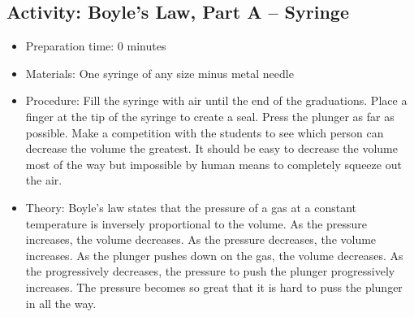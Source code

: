 \begin{itemize}
{\begin{itemize}
\subsection{Activity: Boyle’s Law, Part A – Syringe}
\begin{itemize}
\item{Preparation time: 0 minutes}
\item{Materials: One syringe of any size minus metal needle}
\item{Procedure: Fill the syringe with air until the end of the graduations. Place a finger at the tip of the syringe to create a seal. Press the plunger as far as possible. Make a competition with the students to see which person can decrease the volume the greatest. It should be easy to decrease the volume most of the way but impossible by human means to completely squeeze out the air.}
\item{Theory: Boyle’s law states that the pressure of a gas at a constant temperature is inversely proportional to the volume. As the pressure increases, the volume decreases. As the pressure decreases, the volume increases. As the plunger pushes down on the gas, the volume decreases. As the progressively decreases, the pressure to push the plunger progressively increases. The pressure becomes so great that it is hard to puss the plunger in all the way. }
\end{itemize}


\end{itemize}}
\end{itemize}
